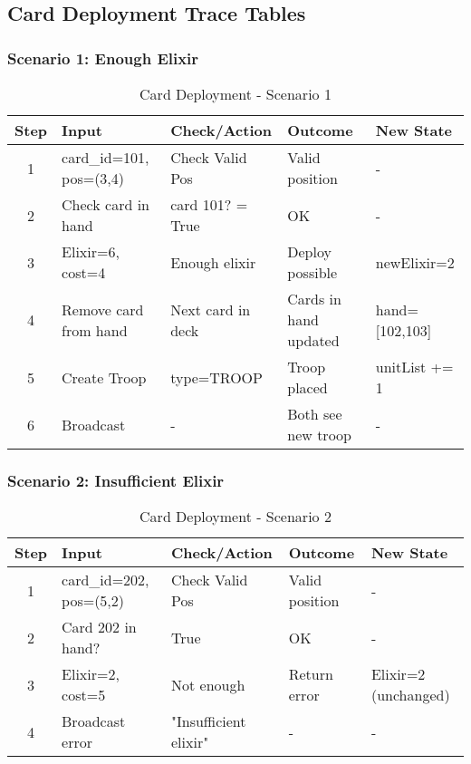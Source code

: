 \documentclass{article}
\begin{document}
\FloatBarrier

\subsection{Card Deployment Trace Tables}

\subsubsection{Scenario 1: Enough Elixir}
\begin{table}[H]
\centering
\footnotesize
\begin{tabularx}{\textwidth}{|c|p{2.2cm}|p{2.2cm}|X|X|}
\hline
\textbf{Step} & \textbf{Input} & \textbf{Check/Action} & \textbf{Outcome} & \textbf{New State}\\
\hline
1 & card\_id=101, pos=(3,4) & Check Valid Pos & Valid position & - \\
\hline
2 & Check card in hand & card 101? = True & OK & - \\
\hline
3 & Elixir=6, cost=4 & Enough elixir & Deploy possible & newElixir=2 \\
\hline
4 & Remove card from hand & Next card in deck & Cards in hand updated & hand=[102,103] \\
\hline
5 & Create Troop & type=TROOP & Troop placed & unitList += 1 \\
\hline
6 & Broadcast & - & Both see new troop & - \\
\hline
\end{tabularx}
\caption{Card Deployment - Scenario 1}
\end{table}

\subsubsection{Scenario 2: Insufficient Elixir}
\begin{table}[H]
\centering
\footnotesize
\begin{tabularx}{\textwidth}{|c|p{2.2cm}|p{2.2cm}|X|X|}
\hline
\textbf{Step} & \textbf{Input} & \textbf{Check/Action} & \textbf{Outcome} & \textbf{New State}\\
\hline
1 & card\_id=202, pos=(5,2) & Check Valid Pos & Valid position & - \\
\hline
2 & Card 202 in hand? & True & OK & - \\
\hline
3 & Elixir=2, cost=5 & Not enough & Return error & Elixir=2 (unchanged) \\
\hline
4 & Broadcast error & "Insufficient elixir" & - & - \\
\hline
\end{tabularx}
\caption{Card Deployment - Scenario 2}
\end{table}
\end{document}
